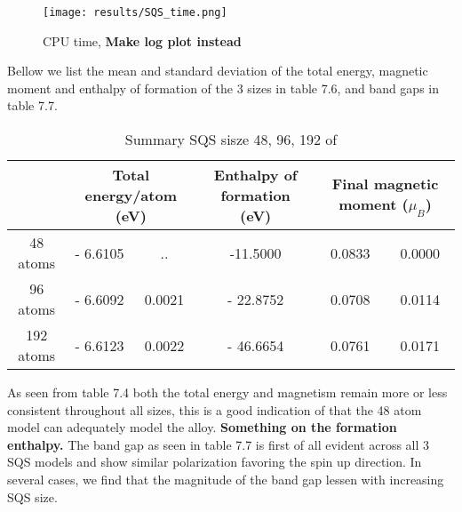 \begin{figure}[H]
\centering
\texttt{[image: results/SQS\_time.png]}
\caption{CPU time, \textbf{Make log plot instead}}
\end{figure}

Bellow we list the mean and standard deviation of the total energy, magnetic moment and enthalpy of formation of the 3 sizes in table 7.6, and band gaps in table 7.7. 

\begin{table}[H]
\hskip-2cm\begin{tabular}{@{}cccccc@{}}
\toprule
       & \multicolumn{2}{c}{Total energy/atom (eV)} & Enthalpy of formation (eV) & \multicolumn{2}{c}{Final magnetic moment ($\mu_B$)} \\ \midrule
48 atoms & - 6.6105 & .. & -11.5000 & 0.0833 & 0.0000    \\
96 atoms & - 6.6092  & 0.0021 & - 22.8752  & 0.0708  & 0.0114     \\
192 atoms & - 6.6123  & 0.0022 & - 46.6654 & 0.0761 & 0.0171     \\ \bottomrule
\end{tabular}
\caption{Summary SQS sisze 48, 96, 192 of }
\end{table}


As seen from table 7.4 both the total energy and magnetism remain more or less consistent throughout all sizes, this is a good indication of that the 48 atom model can adequately model the alloy. \textbf{Something on the formation enthalpy.} The band gap as seen in table 7.7 is first of all evident across all 3 SQS models and show similar polarization favoring the spin up direction. In several cases, we find that the magnitude of the band gap lessen with increasing SQS size. 

